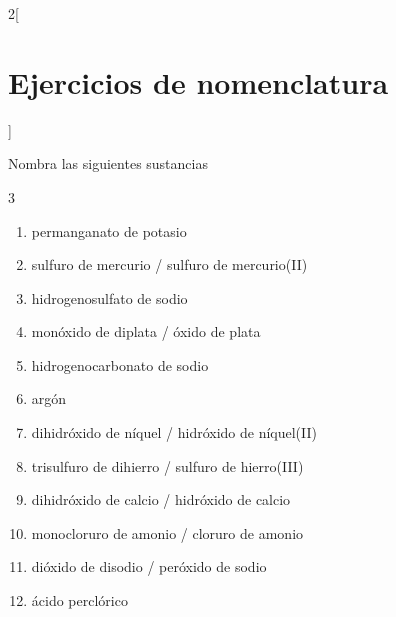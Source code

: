 \documentclass[10pt]{article}
\begin{document}
\begin{multicols*}{2}[
  \section{Ejercicios de nomenclatura}
  ]
\begin{exercise}[
    tags    = {inorgánica,nomenclatura,múltiple,2B},
    topics  = {química inorgánica,formulación,nomenclatura},
    source  = {Química 2B SAN 2016, p372, e7},
  ]
  Nombra las siguientes sustancias

  \begin{enumerate}\begin{multicols}{3}
    \item {}
    \item {}
    \item {}
    \item {}
    \item {}
    \item {}
    \item {}
    \item {}
    \item {}
    \item {}
    \item {}
    \item {}
  \end{multicols}\end{enumerate}
\end{exercise}

\begin{solution}
  \begin{enumerate}
    \item permanganato de potasio
    \item sulfuro de mercurio / sulfuro de mercurio(II)
    \item hidrogenosulfato de sodio
    \item monóxido de diplata / óxido de plata
    \item hidrogenocarbonato de sodio
    \item argón
    \item dihidróxido de níquel / hidróxido de níquel(II)
    \item trisulfuro de dihierro / sulfuro de hierro(III)
    \item dihidróxido de calcio / hidróxido de calcio
    \item monocloruro de amonio / cloruro de amonio
    \item dióxido de disodio / peróxido de sodio
    \item ácido perclórico
  \end{enumerate}
\end{solution}





\end{multicols*}
\end{document}
